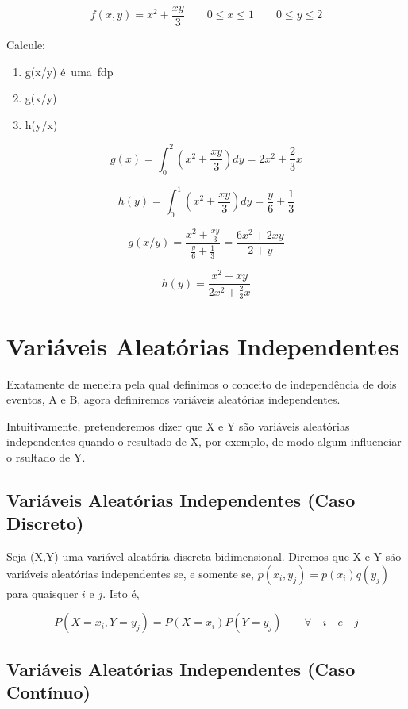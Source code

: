 \documentclass[a4paper,12pt]{report}
\begin{document}
{$$
f(x,y)= x^{2}+\frac{xy}{3} \quad \quad 0\leq x \leq 1 \quad \quad
0\leq y \leq 2
$$

Calcule: \vskip0.3cm

\begin{enumerate}
    \item g(x/y) \mbox{é uma fdp}
    \item g(x/y)
    \item h(y/x)
\end{enumerate}

$$
g(x) = \int^{2}_{0}\left(x^{2}+\frac{xy}{3}\right)dy =
2x^{2}+\frac{2}{3}x
$$


$$
h(y) = \int^{1}_{0}\left(x^{2}+\frac{xy}{3}\right)dy
=\frac{y}{6}+\frac{1}{3}
$$



$$
g(x/y) = \frac{x^{2}+\frac{xy}{3}}{\frac{y}{6}+\frac{1}{3}} =
\frac{6x^{2}+2xy}{2+y}
$$

$$
h(y) = \frac{x^{2}+xy}{2x^{2}+\frac{2}{3}x}
$$

\section{Variáveis Aleatórias Independentes}

Exatamente de meneira pela qual definimos o conceito de
independência de dois eventos, A e B, agora definiremos variáveis
aleatórias independentes.\vskip0.3cm

Intuitivamente, pretenderemos dizer que X e Y são variáveis
aleatórias independentes quando o resultado de X, por exemplo, de
modo algum influenciar o rsultado de Y.

\subsection{Variáveis Aleatórias Independentes (Caso Discreto)}

Seja (X,Y) uma variável aleatória discreta bidimensional. Diremos
que X e Y são variáveis aleatórias independentes se, e somente se,
$p(x_{i},y_{j})=p(x_{i})q(y_{j})$ para quaisquer $i$ e $j$. Isto
é,

\begin{equation}\label{}
    P(X=x_{i},Y=y_{j})=P(X=x_{i})P(Y=y_{j})\quad \quad \forall \quad i \quad
    e \quad j
\end{equation}


\subsection{Variáveis Aleatórias Independentes (Caso Contínuo)}

}
\end{document}
